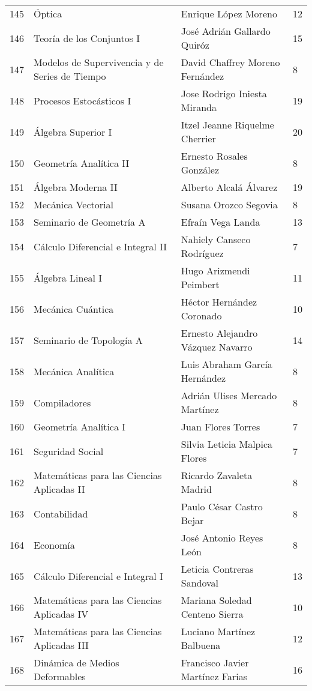 \begin{table}[ht]
\begin{tabular}{rlll}
  145 & Óptica & Enrique López Moreno & 12 \\ 
  146 & Teoría de los Conjuntos I & José Adrián Gallardo Quiróz & 15 \\ 
  147 & Modelos de Supervivencia y de Series de Tiempo & David Chaffrey Moreno Fernández & 8 \\ 
  148 & Procesos Estocásticos I & Jose Rodrigo Iniesta Miranda & 19 \\ 
  149 & Álgebra Superior I & Itzel Jeanne Riquelme Cherrier & 20 \\ 
  150 & Geometría Analítica II & Ernesto Rosales González & 8 \\ 
  151 & Álgebra Moderna II & Alberto Alcalá Álvarez & 19 \\ 
  152 & Mecánica Vectorial & Susana Orozco Segovia & 8 \\ 
  153 & Seminario de Geometría A & Efraín Vega Landa & 13 \\ 
  154 & Cálculo Diferencial e Integral II & Nahiely Canseco Rodríguez & 7 \\ 
  155 & Álgebra Lineal I & Hugo Arizmendi Peimbert & 11 \\ 
  156 & Mecánica Cuántica & Héctor Hernández Coronado & 10 \\ 
  157 & Seminario de Topología A & Ernesto Alejandro Vázquez Navarro & 14 \\ 
  158 & Mecánica Analítica & Luis Abraham García Hernández & 8 \\ 
  159 & Compiladores & Adrián Ulises Mercado Martínez & 8 \\ 
  160 & Geometría Analítica I & Juan Flores Torres & 7 \\ 
  161 & Seguridad Social & Silvia Leticia Malpica Flores & 7 \\ 
  162 & Matemáticas para las Ciencias Aplicadas II & Ricardo Zavaleta Madrid & 8 \\ 
  163 & Contabilidad & Paulo César Castro Bejar & 8 \\ 
  164 & Economía & José Antonio Reyes León & 8 \\ 
  165 & Cálculo Diferencial e Integral I & Leticia Contreras Sandoval & 13 \\ 
  166 & Matemáticas para las Ciencias Aplicadas IV & Mariana Soledad Centeno Sierra & 10 \\ 
  167 & Matemáticas para las Ciencias Aplicadas III & Luciano Martínez Balbuena & 12 \\ 
  168 & Dinámica de Medios Deformables & Francisco Javier Martínez Farias & 16 \\ 

\end{tabular}
\end{table}
